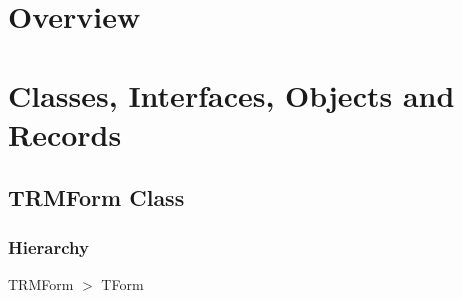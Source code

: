 \documentclass{report}
\newif\ifpdf
\begin{document}
\section{Overview}
\begin{description}
\item[\texttt{\begin{ttfamily}TRMForm\end{ttfamily} Class}]
\end{description}
\section{Classes, Interfaces, Objects and Records}
\ifpdf
\subsection*{\large{\textbf{TRMForm Class}}\normalsize\hspace{1ex}\hrulefill}
\else
\subsection*{TRMForm Class}
\fi
\label{uninstall.TRMForm}
\subsubsection*{\large{\textbf{Hierarchy}}\normalsize\hspace{1ex}\hfill}
TRMForm {$>$} TForm
\end{document}
